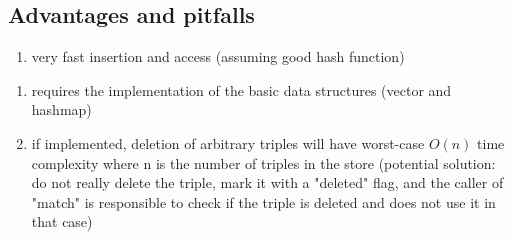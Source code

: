 \subsection{Advantages and pitfalls}
\begin{enumerate}[label={$\boldsymbol{+}$}]
    \item
    very fast insertion and access (assuming good hash function)
\end{enumerate}
\bigskip
\begin{enumerate}[label={$\boldsymbol{-}$}]
    \item
    requires the implementation of the basic data structures (vector and hashmap)
    \item
    if implemented, deletion of arbitrary triples will have worst-case $O(n)$ time complexity where n is the number of triples in the store (potential solution: do not really delete the triple, mark it with a "deleted" flag, and the caller of "match" is responsible to check if the triple is deleted and does not use it in that case)
\end{enumerate}




